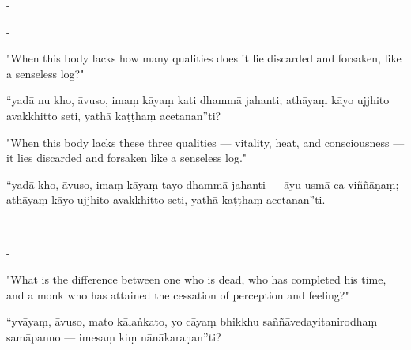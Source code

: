 \begin{samepage}
\begin{leftcolumn*}
-
\end{leftcolumn*}

\begin{rightcolumn}
-
\end{rightcolumn}
\end{samepage}

\begin{samepage}
\begin{leftcolumn*}
"When this body lacks how many qualities does it lie discarded and forsaken, like a senseless log?"
\end{leftcolumn*}

\begin{rightcolumn}
“yadā nu kho, āvuso, imaṃ kāyaṃ kati dhammā jahanti; athāyaṃ kāyo ujjhito avakkhitto seti, yathā kaṭṭhaṃ acetanan”ti?
\end{rightcolumn}
\end{samepage}

\begin{samepage}
\begin{leftcolumn*}
"When this body lacks these three qualities — vitality, heat, and consciousness — it lies discarded and forsaken like a senseless log."
\end{leftcolumn*}

\begin{rightcolumn}
“yadā kho, āvuso, imaṃ kāyaṃ tayo dhammā jahanti — āyu usmā ca viññāṇaṃ; athāyaṃ kāyo ujjhito avakkhitto seti, yathā kaṭṭhaṃ acetanan”ti.
\end{rightcolumn}
\end{samepage}

\begin{samepage}
\begin{leftcolumn*}
-
\end{leftcolumn*}

\begin{rightcolumn}
-
\end{rightcolumn}
\end{samepage}

\begin{samepage}
\begin{leftcolumn*}
"What is the difference between one who is dead, who has completed his time, and a monk who has attained the cessation of perception and feeling?"
\end{leftcolumn*}

\begin{rightcolumn}
“yvāyaṃ, āvuso, mato kālaṅkato, yo cāyaṃ bhikkhu saññāvedayitanirodhaṃ samāpanno — imesaṃ kiṃ nānākaraṇan”ti?
\end{rightcolumn}
\end{samepage}

